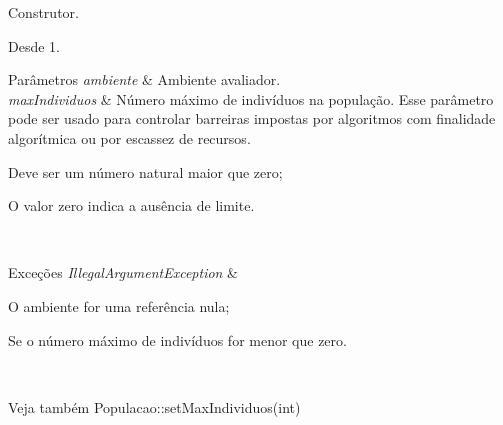 Construtor. 

\begin{DoxySince}{Desde}
1.
\end{DoxySince}

\begin{DoxyParams}{Parâmetros}
{\em ambiente} & Ambiente avaliador. \\
\hline
{\em max\-Individuos} & Número máximo de indivíduos na população. Esse parâmetro pode ser usado para controlar barreiras impostas por algoritmos com finalidade algorítmica ou por escassez de recursos. 
\begin{DoxyItemize}
\item Deve ser um número natural maior que zero; 
\item O valor zero indica a ausência de limite.  
\end{DoxyItemize}\\
\hline
\end{DoxyParams}

\begin{DoxyExceptions}{Exceções}
{\em Illegal\-Argument\-Exception} & 
\begin{DoxyItemize}
\item O ambiente for uma referência nula; 
\item Se o número máximo de indivíduos for menor que zero. 
\end{DoxyItemize}\\
\hline
\end{DoxyExceptions}
\begin{DoxySeeAlso}{Veja também}
Populacao\-::set\-Max\-Individuos(int) 
\end{DoxySeeAlso}


